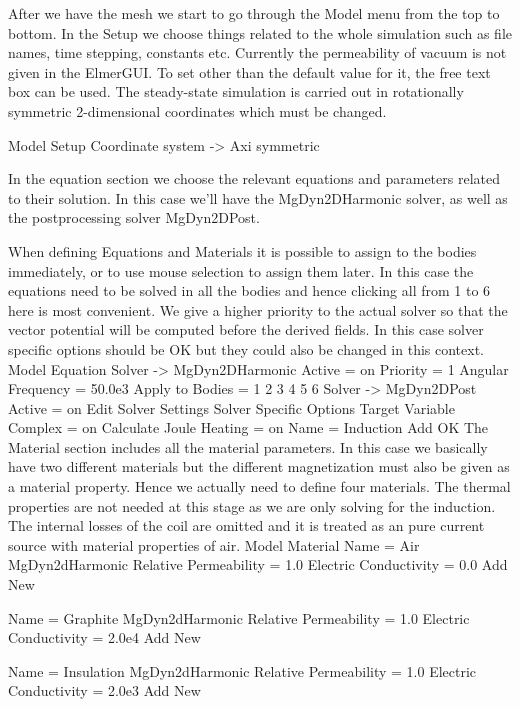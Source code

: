 After we have the mesh we start to go through the Model menu from the top to bottom. 
In the Setup we choose things related to the whole simulation such as file names, 
time stepping, constants etc.
Currently the permeability of vacuum is not given
in the ElmerGUI. To set other than the default value for it, the free text box can be used. 
The steady-state simulation is carried out in rotationally symmetric 2-dimensional 
coordinates which must be changed.

\ttbegin
Model
  Setup  
    Coordinate system -> Axi symmetric
\ttend
 
In the equation section we choose the relevant equations and parameters related to their solution. 
In this case we'll have the MgDyn2DHarmonic solver, as well as the postprocessing solver MgDyn2DPost.

When defining Equations and Materials it is possible to assign to the bodies immediately, or to use mouse
selection to assign them later. In this case the equations need to be solved in all the bodies and 
hence clicking all from 1 to 6 here is most convenient. We give a higher priority to the actual solver
so that the vector potential will be computed before the derived fields. 
In this case solver specific options should be OK but they could also be changed in this context.
\ttbegin
Model
  Equation
	Solver -> MgDyn2DHarmonic
      Active = on
      Priority = 1
      Angular Frequency = 50.0e3
      Apply to Bodies = 1 2 3 4 5 6
    Solver -> MgDyn2DPost
      Active = on
      Edit Solver Settings
        Solver Specific Options
          Target Variable Complex = on
          Calculate Joule Heating = on
    Name = Induction
    Add 
    OK
\ttend        
The Material section includes all the material parameters. In this case we basically have two 
different materials but the different magnetization must also be given as a material property.
Hence we actually need to define four materials. The thermal properties are not needed at this stage as 
we are only solving for the induction. The internal losses of the coil are omitted and it is treated as an
pure current source with material properties of air.  
\ttbegin
Model
  Material
    Name = Air
    MgDyn2dHarmonic
      Relative Permeability = 1.0
      Electric Conductivity = 0.0
    Add
    New
	
    Name = Graphite
    MgDyn2dHarmonic
      Relative Permeability = 1.0
      Electric Conductivity = 2.0e4
    Add
    New

    Name = Insulation
    MgDyn2dHarmonic
      Relative Permeability = 1.0
      Electric Conductivity = 2.0e3
    Add
    New

